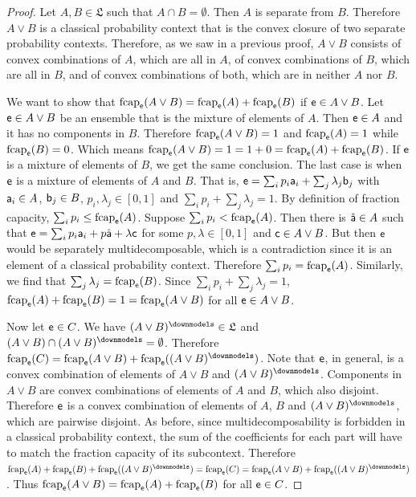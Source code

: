 \begin{proof}
	Let $A, B\in \mathfrak{L}$ such that $A \cap B = \emptyset$. Then $A$ is separate from $B$. Therefore $A \vee B$ is a classical probability context that is the convex closure of two separate probability contexts. Therefore, as we saw in a previous proof, $A \vee B$ consists of convex combinations of $A$, which are all in $A$, of convex combinations of $B$, which are all in $B$, and of convex combinations of both, which are in neither $A$ nor $B$.
	
	We want to show that $\fcap_{\ens}(A \vee B) = \fcap_{\ens}(A) + \fcap_{\ens}(B)$ if $\ens \in A \vee B$. Let $\ens \in A \vee B$ be an ensemble that is the mixture of elements of $A$. Then $\ens \in A$ and it has no components in $B$. Therefore $\fcap_{\ens}(A \vee B) = 1$ and $\fcap_{\ens}(A) = 1$ while $\fcap_{\ens}(B) = 0$. Which means $\fcap_{\ens}(A \vee B) = 1 = 1 + 0 = \fcap_{\ens}(A) + \fcap_{\ens}(B)$. If $\ens$ is a mixture of elements of $B$, we get the same conclusion. The last case is when $\ens$ is a mixture of elements of $A$ and $B$. That is, $\ens = \sum_i p_i \ens[a]_i + \sum_j \lambda_j \ens[b]_j$ with $\ens[a]_i \in A$, $\ens[b]_j \in B$, $p_i, \lambda_j \in [0,1]$ and $\sum_i p_i + \sum_j \lambda_j = 1$. By definition of fraction capacity, $\sum_i p_i \leq \fcap_{\ens}(A)$. Suppose $\sum_i p_i < \fcap_{\ens}(A)$. Then there is $\hat{\ens[a]} \in A$ such that $\ens = \sum_i p_i \ens[a]_i + p \hat{\ens[a]} + \lambda \ens[c]$ for some $p,\lambda \in [0,1]$ and $\ens[c] \in A \vee B$. But then $\ens$ would be separately multidecomposable, which is a contradiction since it is an element of a classical probability context. Therefore $\sum_i p_i = \fcap_{\ens}(A)$. Similarly, we find that $\sum_j \lambda_j = \fcap_{\ens}(B)$. Since $\sum_i p_i + \sum_j \lambda_j = 1$, $\fcap_{\ens}(A) + \fcap_{\ens}(B) = 1 = \fcap_{\ens}(A \vee B)$ for all $\ens \in A \vee B$.
	
	Now let $\ens \in C$. We have $(A \vee B)^\separate \in \mathfrak{L}$ and $(A \vee B) \cap (A \vee B)^\separate = \emptyset$. Therefore $\fcap_{\ens}(C) = \fcap_{\ens}(A \vee B)+ \fcap_{\ens}((A \vee B)^\separate)$. Note that $\ens$, in general, is a convex combination of elements of $A\vee B$ and $(A \vee B)^\separate$. Components in $A \vee B$ are convex combinations of elements of $A$ and $B$, which also disjoint. Therefore $\ens$ is a convex combination of elements of $A$, $B$ and $(A \vee B)^\separate$, which are pairwise disjoint. As before, since multidecomposability is forbidden in a classical probability context, the sum of the coefficients for each part will have to match the fraction capacity of its subcontext. Therefore $\fcap_{\ens}(A) +  \fcap_{\ens}(B) + \fcap_{\ens}((A \vee B)^\separate) = \fcap_{\ens}(C) = \fcap_{\ens}(A \vee B) + \fcap_{\ens}((A \vee B)^\separate)$. Thus $\fcap_{\ens}(A \vee B) = \fcap_{\ens}(A) +  \fcap_{\ens}(B)$ for all $\ens \in C$.
\end{proof}

